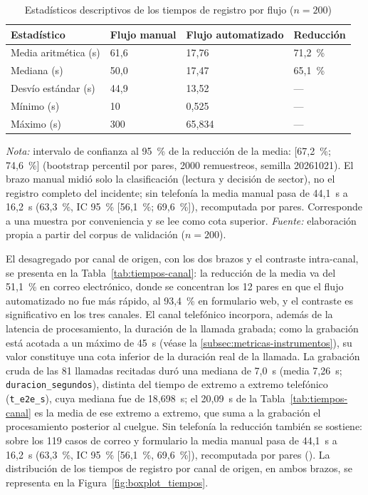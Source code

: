 \begin{table}[htbp]
\centering
\caption{Estadísticos descriptivos de los tiempos de registro por flujo (\(n = 200\))}
\label{tab:tiempos}
\small
\begin{tabular}{@{}>{\raggedright\arraybackslash}p{4.0cm} p{3.5cm} p{3.5cm} p{2.5cm}@{}}
\toprule
\textbf{Estadístico} & \textbf{Flujo manual} & \textbf{Flujo automatizado} & \textbf{Reducción} \\
\midrule
Media aritmética (s)      & 61,6   & 17,76   & 71,2~\% \\
Mediana (s)               & 50,0   & 17,47   & 65,1~\% \\
Desvío estándar (s)       & 44,9   & 13,52   & --- \\
Mínimo (s)                & 10     & 0,525   & --- \\
Máximo (s)                & 300    & 65,834  & --- \\
\bottomrule
\end{tabular}
\par\smallskip
{\footnotesize\textit{Nota:} intervalo de confianza al 95~\% de la reducción de la media: [67,2~\%; 74,6~\%] (bootstrap percentil por pares, 2000 remuestreos, semilla 20261021). El brazo manual midió solo la clasificación (lectura y decisión de sector), no el registro completo del incidente; sin telefonía la media manual pasa de 44,1~s a 16,2~s (63,3~\%, IC 95~\% [56,1~\%; 69,6~\%]), recomputada por pares. Corresponde a una muestra por conveniencia y se lee como cota superior. \textit{Fuente:} elaboración propia a partir del corpus de validación (\(n = 200\)).\par}
\end{table}

El desagregado por canal de origen, con los dos brazos y el contraste intra-canal, se presenta en la Tabla~\ref{tab:tiempos-canal}: la reducción de la media va del 51,1~\% en correo electrónico, donde se concentran los 12 pares en que el flujo automatizado no fue más rápido, al 93,4~\% en formulario web, y el contraste es significativo en los tres canales. El canal telefónico incorpora, además de la latencia de procesamiento, la duración de la llamada grabada; como la grabación está acotada a un máximo de 45~s (véase la \autoref{subsec:metricas-instrumentos}), su valor constituye una cota inferior de la duración real de la llamada. La grabación cruda de las 81 llamadas recitadas duró una mediana de 7,0~s (media 7,26~s; \texttt{duracion\_segundos}), distinta del tiempo de extremo a extremo telefónico (\texttt{t\_e2e\_s}), cuya mediana fue de 18,698~s; el 20,09~s de la Tabla~\ref{tab:tiempos-canal} es la media de ese extremo a extremo, que suma a la grabación el procesamiento posterior al cuelgue. Sin telefonía la reducción también se sostiene: sobre los 119 casos de correo y formulario la media manual pasa de 44,1~s a 16,2~s (63,3~\%, IC 95~\% [56,1~\%, 69,6~\%]), recomputada por pares (). La distribución de los tiempos de registro por canal de origen, en ambos brazos, se representa en la Figura~\ref{fig:boxplot_tiempos}.

